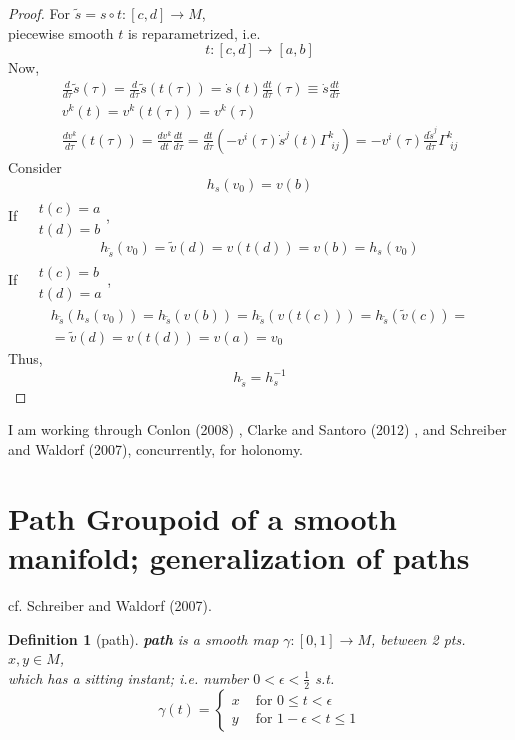 \documentclass[10pt]{amsart}
\newtheorem{definition}{Definition}
\begin{document}
\begin{multicols*}{2}
\begin{proof}
For $\widetilde{s} = s\circ t:[c,d] \to M$, \\
piecewise smooth $t$ is reparametrized, i.e. 
\begin{equation}
	t:[c,d] \to [a,b]
\end{equation}  
Now, 
\[
\begin{gathered}
	\frac{d}{d\tau}\widetilde{s}(\tau) = \frac{d}{d\tau} \widetilde{s}(t(\tau)) = \dot{s}(t) \frac{dt}{d\tau}(\tau) \equiv \dot{s} \frac{dt}{d\tau} \\ 
v^k(t) = v^k(t(\tau)) = v^k(\tau) \\ 
 \frac{dv^k}{d\tau}(t(\tau) ) = \frac{dv^k}{dt} \frac{dt}{ d\tau } = \frac{dt}{d\tau}(-v^i( \tau) \dot{s}^j(t) \Gamma^k_{ \,\, ij} ) = -v^i(\tau) \frac{d\widetilde{s}^j }{ d\tau} \Gamma^k_{ \, \, ij} 
\end{gathered}
\]
Consider 
\[
h_s(v_0) = v(b)
\]
If $\begin{aligned} & \quad \\ 
	& t(c) = a \\ 
	& t(d)=b \end{aligned}$, 
\[
h_{\widetilde{s}}(v_0) = \widetilde{v}(d) = v(t(d)) = v(b) = h_s(v_0)
\]
If $\begin{aligned} & \quad \\ 
	& t(c) = b \\ 
	& t(d)=a \end{aligned}$, 
\[
\begin{gathered}
h_{\widetilde{s}}(h_s(v_0) )  = h_{\widetilde{s}}( v(b)) = h_{\widetilde{s}}(v(t(c))) = h_{\widetilde{s}}(\widetilde{v}(c)) = \\
	= \widetilde{v}(d) = v(t(d)) = v(a) = v_0
\end{gathered}
\]
Thus, 
\[
\boxed{ h_{\widetilde{s}}= h_s^{-1} }
\]


\end{proof}

I am working through Conlon (2008) \cite{Conl2008} , Clarke and Santoro (2012) \cite{ClSa2012}, and Schreiber and Waldorf (2007)\cite{ScWa2007}, concurrently, for holonomy.  

\section{Path Groupoid of a smooth manifold; generalization of paths}
cf. Schreiber and Waldorf (2007)\cite{ScWa2007}.  

\begin{definition}[path]
	\textbf{path} is a smooth map $\gamma:[0,1] \to M$, between 2 pts. $x,y \in M$, \\
	which has a sitting instant; i.e. number $0 < \epsilon < \frac{1}{2}$ s.t. 
	\begin{equation}
	\gamma(t) = \begin{cases} x & \text{ for } 0 \leq t < \epsilon \\
	y & \text{ for } 1 - \epsilon < t \leq 1 \end{cases}
	\end{equation}


\end{definition}
\end{multicols*}
\end{document}
